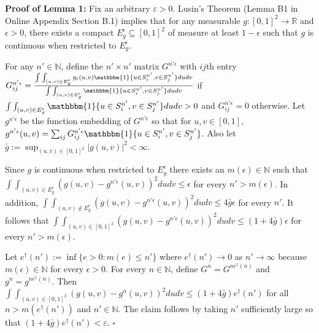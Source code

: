 \documentclass[12pt]{article}
\theoremstyle{definition}
\begin{document}
\begin{flushleft}
\textbf{Proof of Lemma 1:} Fix an arbitrary $\varepsilon > 0$. Lusin's Theorem (Lemma B1 in Online Appendix Section B.1) implies that for any measurable $g: [0,1]^{2} \to \mathbb{R}$ and $\epsilon > 0$, there exists a compact $E^{\epsilon}_{g} \subseteq [0,1]^{2}$ of measure at least $1-\epsilon$ such that $g$ is continuous when restricted to $E^{\epsilon}_{g}$.  \newline

For any $n' \in \mathbb{N}$, define the $n'\times n'$ matrix  $G^{n'\epsilon}$ with $ij$th entry $G_{ij}^{n'\epsilon} = \frac{\int\int_{(u,v) \in E^{\epsilon}_{g}} g_{t}(u,v)\mathbbm{1}\{u \in S_{i}^{n'}, v \in S_{j}^{n'}\}dudv}{\int\int_{(u,v) \in E^{\epsilon}_{g}}\mathbbm{1}\{u \in S_{i}^{n'}, v \in S_{j}^{n'}\}dudv}$  if $\int\int_{(u,v) \in E^{\epsilon}_{g}}\mathbbm{1}\{u \in S_{i}^{n'}, v \in S_{j}^{n'}\}dudv > 0$ and $G_{ij}^{n'\epsilon} = 0$ otherwise. Let $g^{n'\epsilon}$ be the function embedding of $G^{n'\epsilon}$ so that for $u,v \in [0,1]$, $g^{n'\epsilon}(u,v) = \sum_{ij}G_{ij}^{n'\epsilon}\mathbbm{1}\{u \in S_{i}^{n'}, v \in S_{j}^{n'}\}$. Also let  $\bar{g} := \sup_{(u,v) \in [0,1]^{2}}|g(u,v)|^{2} < \infty$. \newline %

Since $g$ is continuous when restricted to $E^{\epsilon}_{g}$ there exists an $m(\epsilon) \in \mathbb{N}$ such that $\int\int_{(u,v) \in E^{ \epsilon}_{g}}\left(g(u,v) - g^{n'\epsilon}(u,v)\right)^{2}dudv \leq \epsilon$ for every $n' > m(\epsilon)$. In addition, $\int\int_{(u,v) \not\in E^{\epsilon}_{g}}\left(g(u,v) - g^{n'\epsilon}(u,v)\right)^{2}dudv \leq 4\bar{g}\epsilon$  for every $n'$. It follows that $\int\int_{(u,v) \in [0,1]^{2}}\left(g(u,v) - g^{n'\epsilon}(u,v)\right)^{2}dudv \leq \left(1+4\bar{g}\right)\epsilon$  for every $n' > m(\epsilon)$.  \newline

Let $e^{\dagger}(n') := \inf\{e > 0: m(e) \leq n'\}$ where $e^{\dagger}(n') \to 0$ as $n'\to \infty$ because $m(\epsilon) \in \mathbb{N}$ for every $\epsilon > 0$. For every $n \in \mathbb{N}$, define $G^{n} = G^{n e^{\dagger}(n)}$ and  $g^{n} = g^{n e^{\dagger}(n)}$. Then $\int\int_{(u,v) \in [0,1]^{2}}\left(g(u,v) - g^{n}(u,v)\right)^{2}dudv \leq \left(1+4\bar{g}\right)e^{\dagger}(n')$ for all $n > m(e^{\dagger}(n'))$ and $n' \in \mathbb{N}$. The claim follows by taking $n'$ sufficiently large so that $\left(1+4\bar{g}\right)e^{\dagger}(n') < \varepsilon$.  $\square$
\end{flushleft}
\end{document}
